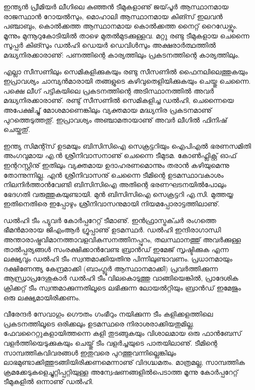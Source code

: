 ﻿
\vskip 2pt

ഇന്ത്യന്‍ പ്രീമിയര്‍ ലീഗിലെ കുഞ്ഞന്‍ ടീമുകളാണു് ജയ്‌പൂര്‍ ആസ്ഥാനമായ രാജസ്ഥാന്‍ റോയല്‍സും, മൊഹാലി 
ആസ്ഥാനമായ കിങ്സ് ഇലവന്‍ പഞ്ചാബും, കൊല്‍ക്കത്ത ആസ്ഥാനമായ കൊല്‍ക്കത്ത നൈറ്റ് റൈഡേഴ്സും. 
മൂന്നും മുന്നൂറുകോടിയില്‍ താഴെ മുതല്‍മുടക്കുള്ളവ. മറ്റു രണ്ടു ടീമുകളായ ചെന്നൈ സൂപ്പര്‍ കിങ്സും ഡല്‍ഹി ഡെയര്‍ 
ഡെവിള്‍സും അക്ഷരാര്‍ത്ഥത്തില്‍ മദ്ധ്യനിരക്കാരാണു്: പണത്തിന്റെ കാര്യത്തിലും പ്രകടനത്തിന്റെ കാര്യത്തിലും.

എല്ലാ സീസണിലും സെമികളിക്കുകയും രണ്ടു സീസണില്‍ ഫൈനലിലെത്തുകയും ഇപ്രാവശ്യം ചാമ്പ്യന്‍മാരായി തങ്ങളുടെ 
കഴിവുതെളിയിക്കുകയും ചെയ്തു ചെന്നൈ. പക്ഷെ ലീഗ് പട്ടികയിലെ പ്രകടനത്തിന്റെ അടിസ്ഥാനത്തില്‍ അവര്‍ 
മദ്ധ്യനിരക്കാരാണു്. രണ്ടു് സീസണില്‍ സെമികളിച്ച ഡല്‍ഹി, ചെന്നൈയെ അപേക്ഷിച്ചു് മോശമാണെങ്കിലും വ്യക്തമായ 
മദ്ധ്യനിര പ്രകടനമാണു് പുറത്തെടുത്തതു്. ഇപ്രാവശ്യം അഞ്ചാമതായാണു് അവര്‍ ലീഗില്‍ ഫിനിഷ് ചെയ്തതു്.

ഇന്ത്യ സിമന്റ്സ് ഉടമയും ബിസിസിഐ സെക്രട്ടറിയും ഐപിഎല്‍ ഭരണസമിതി അംഗവുമായ എ.ന്‍ ശ്രീനിവാസനാണു് 
ചെന്നൈ ടീമുടമ. കോണ്‍ഫ്ലിക്റ്റ് ഓഫ് ഇന്ററസ്റ്റിനു് ഇതിലും വ്യക്തമായ ഉദാഹരണമൊന്നും തരാന്‍ കഴിയുമെന്നു തോന്നുന്നില്ല.
എന്‍ ശ്രീനിവാസനു് ചെന്നൈ ടീമിന്റെ ഉടമസ്ഥാവകാശം നിലനിര്‍ത്താന്‍വേണ്ടി ബിസിസിഐ അതിന്റെ ഭരണഘടനയില്‍പോലും 
ഭേദഗതി വരുത്തുകയുണ്ടായി. മുന്‍ ബിസിസിഐ സെക്രട്ടറി എ.സി. മുത്തയ്യ ഇതിനെതിരെ ഇപ്പോഴും ശ്രീനിവാസനുമായി 
നിയമപ്പോരാട്ടത്തിലാണു്.

ഡല്‍ഹി ടീം പ്യുവര്‍ കോര്‍പ്പറേറ്റ് ടീമാണു്. ഇന്‍ഫ്രാസ്ട്രക്ചര്‍ രംഗത്തെ ഭീമന്‍മാരായ ജിഎംആര്‍ ഗ്രൂപ്പാണു് ഉടമസ്ഥര്‍. 
ഡല്‍ഹി ഇന്ദിരാഗാന്ധി അന്താരാഷ്ട്രവിമാനത്താവളവികസനത്തിനപ്പുറം, തലസ്ഥാനത്തു് അവര്‍ക്കുള്ള താല്‍പ്പര്യങ്ങള്‍ 
സംരക്ഷിക്കാന്‍വേണ്ട ബ്രാന്‍ഡ് ഇമേജ് സൃഷ്ടിക്കുക എന്ന ലക്ഷ്യവും ഡല്‍ഹി ടീം സ്വന്തമാക്കിയതിനു പിന്നിലുണ്ടാവണം. 
പ്രധാനമായും ദക്ഷിണേന്ത്യ കേന്ദ്രമാക്കി (ബാംഗ്ലൂര്‍ ആസ്ഥാനമാക്കി) പ്രവര്‍ത്തിക്കുന്ന ആന്ധ്രാപ്രദേശുകാര്‍ ഡല്‍ഹി ടീം വിലകൊടുത്തു
 വാങ്ങിയെങ്കില്‍, പ്രാദേശിക ക്രിക്കറ്റ് ടീം സ്വന്തമാക്കുന്നതിലൂടെ ലഭിക്കുന്ന ലോയല്‍റ്റിയും ബ്രാന്‍ഡ് ഇമേജും ഒരു 
ലക്ഷ്യമായിരിക്കണം.

വീരേന്ദര്‍ സേവാഗും ഗൌതം ഗംഭീറും നയിക്കുന്ന ടീം കളിക്കളത്തിലെ പ്രകടനത്തിലൂടെ ഒരിക്കലും ഉടമസ്ഥരെ 
നിരാശരാക്കിയതുമില്ല. ഫേവറൈറ്റുകളായിത്തന്നെ കളി തുടങ്ങുകയും വിശാലമായ ഒരു ഫാന്‍ബേസ് വളര്‍ത്തിയെടുക്കുകയും 
ചെയ്തു് ടീം വളര്‍ച്ചയുടെ പാതയിലാണു്. ടീമിന്റെ സാമ്പത്തികവിവരങ്ങള്‍ ഇതുവരെ പുറത്തുവന്നില്ലെങ്കിലും 
ലാഭമുണ്ടാക്കിത്തുടങ്ങിയിരിക്കണമെന്നാണു് വിദഗ്ദ്ധമതം. മാത്രമല്ല, സാമ്പത്തിക ക്രമക്കേടുകളെച്ചുറ്റിപ്പറ്റിയുള്ള 
അന്വേഷണങ്ങളില്‍പെടാത്ത മൂന്നു കോര്‍പ്പറേറ്റ് ടീമുകളില്‍ ഒന്നാണു് ഡല്‍ഹി.

